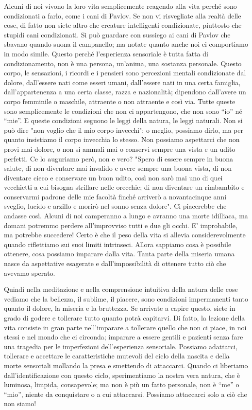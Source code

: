Alcuni di noi vivono la loro vita semplicemente reagendo alla vita
perché sono condizionati a farlo, come i cani di Pavlov. Se non vi
risvegliate alla realtà delle cose, di fatto non siete altro che
creature intelligenti condizionate, piuttosto che stupidi cani
condizionati. Si può guardare con sussiego ai cani di Pavlov che sbavano
quando suona il campanello; ma notate quanto anche noi ci comportiamo in
modo simile. Questo perché l'esperienza sensoriale è tutta fatta di
condizionamento, non è una persona, un'anima, una sostanza personale.
Questo corpo, le sensazioni, i ricordi e i pensieri sono percezioni
mentali condizionate dal dolore, dall'essere nati come esseri umani,
dall'essere nati in una certa famiglia, dall'appartenenza a una certa
classe, razza e nazionalità; dipendono dall'avere un corpo femminile o
maschile, attraente o non attraente e così via. Tutte queste sono
semplicemente le condizioni che non ci appartengono, che non sono “io”
né “mie”. E queste condizioni seguono le leggi della natura, le leggi
naturali. Non si può dire "non voglio che il mio corpo invecchi"; o
meglio, possiamo dirlo, ma per quanto insistiamo il corpo invecchia lo
stesso. Non possiamo aspettarci che non provi mai dolore, o non si
ammali mai o conservi sempre una vista e un udito perfetti. Ce lo
auguriamo però, non e vero? "Spero di essere sempre in buona salute, di
non diventare mai invalido e avere sempre una buona vista, di non
diventare cieco e conservare un buon udito, così non sarò mai uno di
quei vecchietti a cui bisogna strillare nelle orecchie; di non diventare
un rimbambito e conservarmi padrone delle mie facoltà finché arriverò a
novantacinque anni sveglio, lucido e arzillo e morirò nel sonno senza
dolore". Ci piacerebbe che andasse così. Alcuni di noi camperanno a
lungo e avranno una morte idilliaca, ma domani potremmo perdere
all'improvviso tutti e due gli occhi. E' improbabile, ma potrebbe
succedere! Certo è che il peso della vita si allevia considerevolmente
quando riflettiamo sui suoi limiti intrinseci. Allora sappiamo cosa è
possibile ottenere, cosa possiamo imparare dalla vita. Tanta parte della
miseria umana nasce da aspettative esagerate e dall'impossibilità di
ottenere tutto ciò che avevamo sperato.

Quindi nella meditazione e nella comprensione intuitiva della natura
delle cose vediamo che la bellezza, il sublime, il piacere, sono
condizioni impermanenti tanto quanto il dolore, la miseria e la
bruttezza. Se arrivate a capire questo, siete in grado di godere e
tollerare tutto quanto potrà capitarvi. Di fatto, la lezione della vita
consiste in gran parte nell'imparare a tollerare quello che non ci
piace, in noi stessi e nel mondo che ci circonda; imparare a essere
gentili e pazienti senza fare una tragedia per le imperfezioni
dell'esperienza sensoriale. Possiamo adattarci, tollerare e accettare le
caratteristiche mutevoli del ciclo della nascita e della morte
sensoriali mollando la presa e smettendo di attaccarci. Quando ci
liberiamo dall'identificazione con questo ciclo, sperimentiamo la nostra
vera natura, che è luminosa, limpida, consapevole; ma non è più un fatto
personale, non è “me” o “mio”, niente da conquistare o a cui attaccarsi.
Possiamo attaccarci solo a ciò che non siamo!

